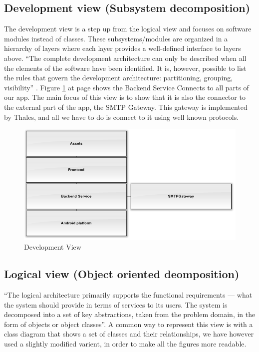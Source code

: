 \subsection{Development view (Subsystem decomposition)}
The development view is a step up from the logical view and focuses on software modules instead of classes. These subsystems/modules are organized in a hierarchy of layers where each layer provides a well-defined interface to layers above. ``The complete development architecture can only be described when all the elements of the software have been identified. It is, however, possible to list the rules that govern the development architecture: partitioning, grouping, visibility'' \cite{bib:vm}. 
Figure \ref{fig:developmentview} at page \pageref{fig:developmentview} shows the Backend Service Connects to all parts of our app. The main focus of this view is to show that it is also the connector to the external part of the app, the SMTP Gateway. This gateway is implemented by Thales, and all we have to do is connect to it using well known protocols.

\begin{figure}[H]
	\includegraphics[width=\textwidth]{developmentview.png}
	\caption{Development View}
	\label{fig:developmentview}
\end{figure}

\subsection{Logical view (Object oriented deomposition)}\label{ch:logicalview}
``The logical architecture primarily supports the functional requirements --- what the system should provide in terms of services to its users. The system is decomposed into a set of key abstractions, taken from the problem domain, in the form of objects or object classes''\cite{bib:vm}. A common way to represent this view is with a class diagram that shows a set of classes and their relationships, we have however used a slightly modified varient, in order to make all the figures more readable.\newline\newline
